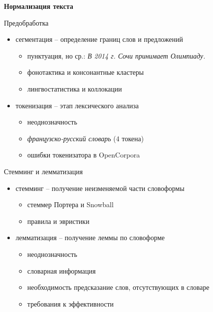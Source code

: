 \documentclass{beamer}
\begin{document}

\begin{frame}{}
\begin{center}
	\textbf{Нормализация текста}
\end{center}
\end{frame}

\begin{frame}{Предобработка}
\begin{itemize}
	\item сегментация -- определение границ слов и предложений
	    \begin{itemize}
	        \item пунктуация, но ср.: \textit{В 2014 г. Сочи принимает Олимпиаду.}
	        \item фонотактика и консонантные кластеры
	        \item лингвостатистика и коллокации
	    \end{itemize}
	\item токенизация -- этап лексического анализа
	    \begin{itemize}
	        \item неоднозначность
	        \item \textit{французско-русский словарь} (4 токена)
	        \item ошибки токенизатора в OpenCorpora
	    \end{itemize}
\end{itemize}
\end{frame}

\begin{frame}{Стемминг и лемматизация}
\begin{itemize}
    \item стемминг -- получение неизменяемой части словоформы
        \begin{itemize}
            \item стеммер Портера и Snowball
            \item правила и эвристики
        \end{itemize}
	\item лемматизация -- получение леммы по словоформе
        \begin{itemize}
            \item неоднозначность
            \item словарная информация 
            \item необходимость предсказание слов, отсутствующих в словаре
            \item требования к эффективности
        \end{itemize}
\end{itemize}
\end{frame}
\end{document}
